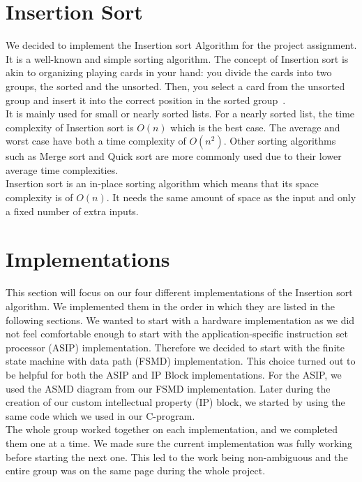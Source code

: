 \documentclass[conference]{IEEEtran}
\begin{document}
\section{Insertion Sort}
We decided to implement the Insertion sort Algorithm for the project assignment. It is a well-known and simple sorting algorithm. The concept of Insertion sort is akin to organizing playing cards in your hand: you divide the cards into two groups, the sorted and the unsorted. Then, you select a card from the unsorted group and insert it into the correct position in the sorted group~\cite{g4g}.\\
It is mainly used for small or nearly sorted lists. For a nearly sorted list, the time complexity of Insertion sort is $O(n)$ which is the best case. The average and worst case have both a time complexity of $O(n^2)$. Other sorting algorithms such as Merge sort and Quick sort are more commonly used due to their lower average time complexities.\\
Insertion sort is an in-place sorting algorithm which means that its space complexity is of $O(n)$. It needs the same amount of space as the input and only a fixed number of extra inputs.

\section{Implementations}
This section will focus on our four different implementations of the Insertion sort algorithm. We implemented them in the order in which they are listed in the following sections. We wanted to start with a hardware implementation as we did not feel comfortable enough to start with the application-specific instruction set processor (ASIP) implementation. Therefore we decided to start with the finite state machine with data path (FSMD) implementation. This choice turned out to be helpful for both the ASIP and IP Block implementations. For the ASIP, we used the ASMD diagram from our FSMD implementation. Later during the creation of our custom intellectual property (IP) block, we started by using the same code which we used in our C-program. \\
The whole group worked together on each implementation, and we completed them one at a time. We made sure the current implementation was fully working before starting the next one. This led to the work being non-ambiguous and the entire group was on the same page during the whole project.
\end{document}
